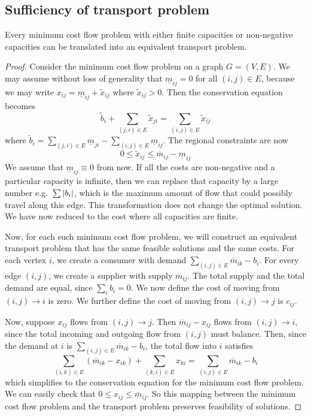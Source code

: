 \subsection{Sufficiency of transport problem}
\begin{theorem}
	Every minimum cost flow problem with either finite capacities or non-negative capacities can be translated into an equivalent transport problem.
\end{theorem}
\begin{proof}
	Consider the minimum cost flow problem on a graph \( G = (V, E) \).
	We may assume without loss of generality that \( \underline m_{ij} = 0 \) for all \( (i,j) \in E \), because we may write \( x_{ij} = \underline m_{ij} + \widetilde x_{ij} \) where \( \widetilde x_{ij} > 0 \).
	Then the conservation equation becomes
	\[
		\widetilde{b}_i + \sum_{(j,i) \in E}\widetilde{x}_{ji} = \sum_{(i,j) \in E}\widetilde{x}_{ij}
	\]
	where \( \widetilde{b}_i = \sum_{(j,i) \in E}\underline{m}_{ji} - \sum_{(i,j) \in E}\underline{m}_{ij} \).
	The regional constraints are now
	\[
		0 \leq \widetilde{x}_{ij} \leq \overline m_{ij} - \underline m_{ij}
	\]
	We assume that \( \underline m_{ij} \equiv 0 \) from now.
	If all the costs are non-negative and a particular capacity is infinite, then we can replace that capacity by a large number e.g.\ \( \sum \abs{b_i} \),
	which is the maximum amount of flow that could possibly travel along this edge.
	This transformation does not change the optimal solution.
	We have now reduced to the cost where all capacities are finite.

	\medskip\noindent Now, for each such minimum cost flow problem, we will construct an equivalent transport problem that has the same feasible solutions and the same costs.
	For each vertex \( i \), we create a consumer with demand \( \sum_{(i,j) \in E} \overline m_{ik} - b_i \).
	For every edge \( (i,j) \), we create a supplier with supply \( \overline m_{ij} \).
	The total supply and the total demand are equal, since \( \sum_i b_i = 0 \).
	We now define the cost of moving from \( (i,j) \to i \) is zero.
	We further define the cost of moving from \( (i,j) \to j \) is \( c_{ij} \).

	\medskip\noindent Now, suppose \( x_{ij} \) flows from \( (i,j) \to j \).
	Then \( \overline m_{ij} - x_{ij} \) flows from \( (i,j) \to i \), since the total incoming and outgoing flow from \( (i,j) \) must balance.
	Then, since the demand at \( i \) is \( \sum_{(i,j) \in E} \overline m_{ik} - b_i \), the total flow into \( i \) satisfies
	\[
		\sum_{(i,k) \in E} (\overline m_{ik} - x_{ik}) + \sum_{(k,i) \in E} x_{ki} = \sum_{(i,j) \in E} \overline m_{ik} - b_i
	\]
	which simplifies to the conservation equation for the minimum cost flow problem.
	We can easily check that \( 0 \leq x_{ij} \leq \overline m_{ij} \).
	So this mapping between the minimum cost flow problem and the transport problem preserves feasibility of solutions.


\end{proof}
